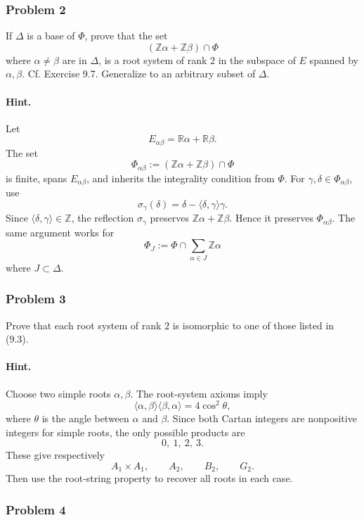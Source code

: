 \documentclass[12pt, a4paper]{article}
\begin{document}
\subsubsection{Problem 2}

If \(\Delta\) is a base of \(\Phi\), prove that the set
\[
(\mathbb Z\alpha+\mathbb Z\beta)\cap\Phi
\]
where \(\alpha\neq\beta\) are in \(\Delta\), is a root system of rank \(2\) in
the subspace of \(E\) spanned by \(\alpha,\beta\). Cf. Exercise 9.7. Generalize
to an arbitrary subset of \(\Delta\).

\paragraph{Hint.}
Let
\[
E_{\alpha\beta}=\mathbb R\alpha+\mathbb R\beta.
\]
The set
\[
\Phi_{\alpha\beta}:=(\mathbb Z\alpha+\mathbb Z\beta)\cap\Phi
\]
is finite, spans \(E_{\alpha\beta}\), and inherits the integrality condition
from \(\Phi\). For \(\gamma,\delta\in\Phi_{\alpha\beta}\), use
\[
\sigma_\gamma(\delta)=\delta-\langle\delta,\gamma\rangle\gamma.
\]
Since \(\langle\delta,\gamma\rangle\in\mathbb Z\), the reflection
\(\sigma_\gamma\) preserves \(\mathbb Z\alpha+\mathbb Z\beta\). Hence it
preserves \(\Phi_{\alpha\beta}\). The same argument works for
\[
\Phi_J:=\Phi\cap\sum_{\alpha\in J}\mathbb Z\alpha
\]
where \(J\subset\Delta\).

\subsubsection{Problem 3}

Prove that each root system of rank \(2\) is isomorphic to one of those listed
in (9.3).

\paragraph{Hint.}
Choose two simple roots \(\alpha,\beta\). The root-system axioms imply
\[
\langle\alpha,\beta\rangle\langle\beta,\alpha\rangle
=
4\cos^2\theta,
\]
where \(\theta\) is the angle between \(\alpha\) and \(\beta\). Since both
Cartan integers are nonpositive integers for simple roots, the only possible
products are
\[
0,\ 1,\ 2,\ 3.
\]
These give respectively
\[
A_1\times A_1,\qquad A_2,\qquad B_2,\qquad G_2.
\]
Then use the root-string property to recover all roots in each case.

\subsubsection{Problem 4}
\end{document}
